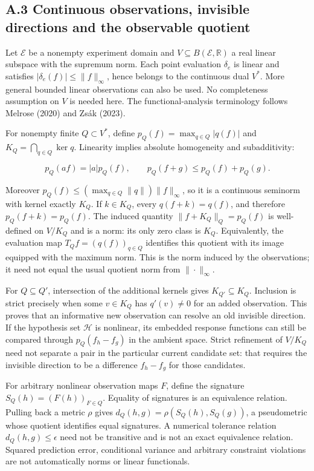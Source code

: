 \documentclass[twoside,11pt]{article}
\begin{document}
\subsection*{A.3 Continuous observations, invisible directions and the observable quotient}

Let \(\mathcal E\) be a nonempty experiment domain and \(V\subseteq B(\mathcal E,\mathbb R)\) a real linear subspace with the supremum norm. Each point evaluation \(\delta_e\) is linear and satisfies \(|\delta_e(f)|\leq\|f\|_\infty\), hence belongs to the continuous dual \(V^*\). More general bounded linear observations can also be used. No completeness assumption on \(V\) is needed here. The functional-analysis terminology follows Melrose (2020) and Zsák (2023).


For nonempty finite \(Q\subset V^*\), define \(p_Q(f)=\max_{q\in Q}|q(f)|\) and \(K_Q=\bigcap_{q\in Q}\ker q\). Linearity implies absolute homogeneity and subadditivity:


\[
p_Q(af)=|a|p_Q(f),\qquad p_Q(f+g)\leq p_Q(f)+p_Q(g).
\]


Moreover \(p_Q(f)\leq (\max_{q\in Q}\|q\|)\|f\|_\infty\), so it is a continuous seminorm with kernel exactly \(K_Q\). If \(k\in K_Q\), every \(q(f+k)=q(f)\), and therefore \(p_Q(f+k)=p_Q(f)\). The induced quantity \(\|f+K_Q\|_Q=p_Q(f)\) is well-defined on \(V/K_Q\) and is a norm: its only zero class is \(K_Q\). Equivalently, the evaluation map \(T_Qf=(q(f))_{q\in Q}\) identifies this quotient with its image equipped with the maximum norm. This is the norm induced by the observations; it need not equal the usual quotient norm from \(\|\cdot\|_\infty\).


For \(Q\subseteq Q'\), intersection of the additional kernels gives \(K_{Q'}\subseteq K_Q\). Inclusion is strict precisely when some \(v\in K_Q\) has \(q'(v)\ne0\) for an added observation. This proves that an informative new observation can resolve an old invisible direction. If the hypothesis set \(\mathcal H\) is nonlinear, its embedded response functions can still be compared through \(p_Q(f_h-f_g)\) in the ambient space. Strict refinement of \(V/K_Q\) need not separate a pair in the particular current candidate set: that requires the invisible direction to be a difference \(f_h-f_g\) for those candidates.


For arbitrary nonlinear observation maps \(F\), define the signature \(S_Q(h)=(F(h))_{F\in Q}\). Equality of signatures is an equivalence relation. Pulling back a metric \(\rho\) gives \(d_Q(h,g)=\rho(S_Q(h),S_Q(g))\), a pseudometric whose quotient identifies equal signatures. A numerical tolerance relation \(d_Q(h,g)\leq\epsilon\) need not be transitive and is not an exact equivalence relation. Squared prediction error, conditional variance and arbitrary constraint violations are not automatically norms or linear functionals.
\end{document}
